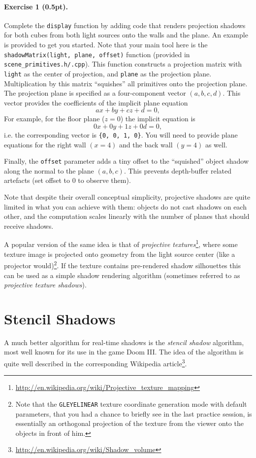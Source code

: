 \documentclass{article}
\newenvironment{exercise}[2]{\paragraph{Exercise #1 (#2pt).} }{
\medskip}
\begin{document}
\begin{exercise}{1}{0.5} Complete the \verb#display# function by adding code that renders projection shadows for both cubes from both light sources onto the walls and the plane. An example is provided to get you started. Note that your main tool here is the \verb#shadowMatrix(light, plane, offset)# function (provided in \verb#scene_primitives.h/.cpp#). This function constructs a projection matrix with \verb#light# as the center of projection, and \verb#plane# as the projection plane. Multiplication by this matrix ``squishes'' all primitives onto the projection plane. The projection plane is specified as a four-component vector $(a, b, c, d)$. This vector provides the coefficients of the implicit plane equation
$$
ax + by + cz + d = 0,
$$
For example, for the floor plane ($z = 0$) the implicit equation is 
$$
0x + 0y + 1z + 0d = 0,
$$
i.e. the corresponding vector is \verb#{0, 0, 1, 0}#. You will need to provide plane equations for the right wall $(x = 4)$ and the back wall $(y = 4)$ as well.

Finally, the \verb#offset# parameter adds a tiny offset to the ``squished'' object shadow along the normal to the plane $(a, b, c)$. This prevents depth-buffer related artefacts (set offset to $0$ to observe them).
\end{exercise}

Note that despite their overall conceptual simplicity, projective shadows are quite limited in what you can achieve with them: objects do not cast shadows on each other, and the computation scales linearly with the number of planes that should receive shadows.

A popular version of the same idea is that of \emph{projective textures}\footnote{\url{http://en.wikipedia.org/wiki/Projective_texture_mapping}}, where some texture image is projected onto geometry from the light source center (like a projector would)\footnote{Note that the \texttt{GL\textunderscore EYE\textunderscore LINEAR} texture coordinate generation mode with default parameters, that you had a chance to briefly see in the last practice session, is essentially an orthogonal projection of the texture from the viewer onto the objects in front of him.}. If the texture contains pre-rendered shadow silhouettes this can be used as a simple shadow rendering algorithm (sometimes referred to as \emph{projective texture shadows}).


\section{Stencil Shadows}
A much better algorithm for real-time shadows is the \emph{stencil shadow} algorithm, most well known for its use in the game Doom III. The idea of the algorithm is quite well described in the corresponding Wikipedia article\footnote{\url{http://en.wikipedia.org/wiki/Shadow_volume}}.
\end{document}
